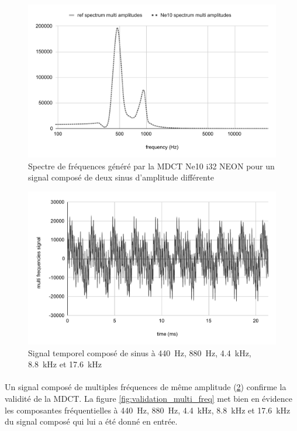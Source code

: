 \documentclass{article}
\begin{document}
    \begin{figure}[H]
        \centering
        \includegraphics[width=.8\linewidth]{./images/validation_ne10_i32_neon_multi_ampl.pdf}
        \caption{Spectre de fréquences généré par la MDCT Ne10 i32 NEON pour un signal composé de deux sinus d'amplitude différente}
        \label{fig:validation_ne10_i32_neon_multi_ampl}
    \end{figure}

    \begin{figure}[H]
        \centering
        \includegraphics[width=.8\linewidth]{./images/signal_multi_freq.pdf}
        \caption{Signal temporel composé de sinus à \SI{440}{\hertz}, \SI{880}{\hertz}, \SI{4.4}{\kilo\hertz}, \SI{8.8}{\kilo\hertz} et \SI{17.6}{\kilo\hertz}}
        \label{fig:signal_multi_freq}
    \end{figure}

    \paragraph{}
    Un signal composé de multiples fréquences de même amplitude (\ref{fig:signal_multi_freq}) confirme la validité de la MDCT. La figure \ref{fig:validation_multi_freq} met bien en évidence les composantes fréquentielles à \SI{440}{\hertz}, \SI{880}{\hertz}, \SI{4.4}{\kilo\hertz}, \SI{8.8}{\kilo\hertz} et \SI{17.6}{\kilo\hertz} du signal composé qui lui a été donné en entrée.
\end{document}
